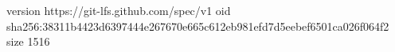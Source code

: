 version https://git-lfs.github.com/spec/v1
oid sha256:38311b4423d6397444e267670e665c612eb981efd7d5eebef6501ca026f064f2
size 1516
